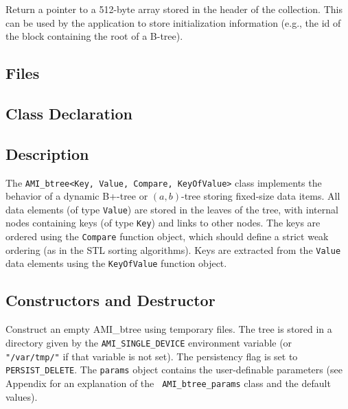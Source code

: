         {Return a pointer to a 512-byte array
        stored in the header of the collection. This can be used by the
        application to store initialization information (e.g., the id of
        the block containing the root of a B-tree).}

   \etabb
{}



\subsection{Files}
\btabb
    {}
\etabb

\subsection{Class Declaration}

\btabb
    {}
\etabb

\subsection{Description}

The {\tt AMI\_btree<Key, Value, Compare, KeyOfValue>} class implements the
behavior of a dynamic B+-tree or $(a,b)$-tree storing fixed-size data
items. All data elements (of type {\tt Value}) are stored in the leaves of
the tree, with internal nodes containing keys (of type {\tt Key}) and links
to other nodes. The keys are ordered using the {\tt Compare} function
object, which should define a strict weak ordering (as in the STL sorting
algorithms). Keys are extracted from the {\tt Value} data elements using
the {\tt KeyOfValue} function object.

\subsection{Constructors and Destructor}

\btabb

   {Construct an empty AMI\_btree using temporary files. The tree is stored in a
   directory given by the {\tt AMI\_SINGLE\_DEVICE} environment variable (or {\tt
   "/var/tmp/"} if that variable is not set). The persistency flag is set to
   {\tt PERSIST\_DELETE}. The {\tt params} object contains the
   user-definable parameters (see Appendix for an explanation of the {\tt
   AMI\_btree\_params} class and the default values).}

